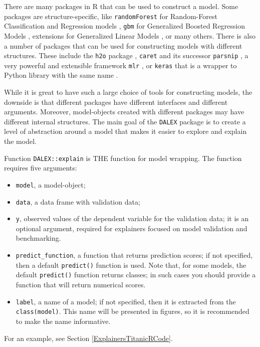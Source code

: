 \documentclass[]{krantz}
\providecommand{\tightlist}{%
  \setlength{\itemsep}{0pt}\setlength{\parskip}{0pt}}
\begin{document}
There are many packages in R that can be used to construct a model. Some packages are structure-specific, like \texttt{randomForest} for Random-Forest Classification and Regression models \citep{randomForest}, \texttt{gbm} for Generalized Boosted Regression Models \citep{gbm}, extensions for Generalized Linear Models \citep{rms}, or many others. There is also a number of packages that can be used for constructing models with different structures. These include the \texttt{h2o} package \citep{h2oPackage}, \texttt{caret} \citep{caret} and its successor \texttt{parsnip} \citep{parsnipPackage}, a very powerful and extensible framework \texttt{mlr} \citep{mlr}, or \texttt{keras} that is a wrapper to Python library with the same name \citep{kerasPackage}.

While it is great to have such a large choice of tools for constructing models, the downside is that different packages have different interfaces and different arguments. Moreover, model-objects created with different packages may have different internal structures. The main goal of the \texttt{DALEX} package is to create a level of abstraction around a model that makes it easier to explore and explain the model.

Function \texttt{DALEX::explain} is THE function for model wrapping. The function requires five arguments:

\begin{itemize}
\tightlist
\item
  \texttt{model}, a model-object;
\item
  \texttt{data}, a data frame with validation data;
\item
  \texttt{y}, observed values of the dependent variable for the validation data; it is an optional argument, required for explainers focused on model validation and benchmarking.
\item
  \texttt{predict\_function}, a function that returns prediction scores; if not specified, then a default \texttt{predict()} function is used. Note that, for some models, the default \texttt{predict()} function returns classes; in such cases you should provide a function that will return numerical scores.
\item
  \texttt{label}, a name of a model; if not specified, then it is extracted from the \texttt{class(model)}. This name will be presented in figures, so it is recommended to make the name informative.
\end{itemize}

For an example, see Section \ref{ExplainersTitanicRCode}.
\end{document}
